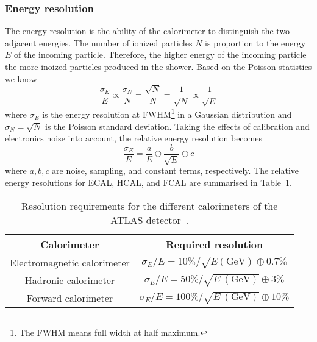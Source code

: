
\subsubsection{Energy resolution}
\label{subsubsed:ae_energy_resolution}
The energy resolution is the ability of the calorimeter to distinguish the two adjacent energies.
The number of ionized particles $N$ is proportion to the energy $E$ of the incoming particle.
%
%
Therefore, the higher energy of the incoming particle the more inoized particles produced in the shower.
Based on the Poisson statistics we know
%
\begin{equation}
\frac{\sigma_{E}}{E} \propto \frac{\sigma_{N}}{N} = \frac{\sqrt{N}}{N} = \frac{1}{\sqrt{N}} \propto \frac{1}{\sqrt{E}}
\label{eq:ae_energy_resolution}
\end{equation}
where $\sigma_{E}$ is the energy resolution at FWHM\footnote{The FWHM means full width at half maximum.} in a Gaussian distribution and $\sigma_{N} = \sqrt{N}$ is the Poisson standard deviation.
Taking the effects of calibration and electronics noise into account, the relative energy resolution becomes
\begin{equation}
\frac{\sigma_{E}}{E} = \frac{a}{E} \oplus \frac{b}{\sqrt{E}} \oplus c
\label{eq:ae_relative_energy_resolution}
\end{equation}
where $a, b, c$ are noise, sampling, and constant terms, respectively.
The relative energy resolutions for ECAL, HCAL, and FCAL are summarised in Table~\ref{tab:ae_relative_energy_resolution}.

\begin{table}[htbp]
\begin{center}
\begin{tabular}{cc}
\hline
\hline
Calorimeter & Required resolution\\
\hline
Electromagnetic calorimeter & $\sigma_{E}/E = 10\% / \sqrt{E\mathrm{ (GeV)}} \oplus 0.7\%$\\
Hadronic calorimeter & $\sigma_{E}/E = 50\% / \sqrt{E~\mathrm{(GeV)}} \oplus 3\%$\\
Forward calorimeter & $\sigma_{E}/E = 100\% / \sqrt{E~\mathrm{(GeV)}} \oplus 10\%$\\
\hline
\hline
\end{tabular}
\end{center}
\caption{Resolution requirements for the different calorimeters of the ATLAS detector~\cite{1748-0221-3-08-S08003}.}
\label{tab:ae_relative_energy_resolution}
\end{table}%

